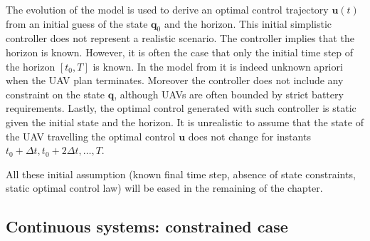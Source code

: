 The evolution of the model is used to derive an optimal control trajectory $\mathbf{u}(t)$ from an initial guess of the state $\mathbf{q}_0$ and the horizon. This initial simplistic controller does not represent a realistic scenario. The controller implies that the horizon is known. However, it is often the case that only the initial time step of the horizon $[t_0,T]$ is known. In the model from  it is indeed unknown apriori when the UAV plan terminates. Moreover the controller does not include any constraint on the state $\mathbf{q}$, although UAVs are often bounded by strict battery requirements. Lastly, the optimal control generated with such controller is static given the initial state and the horizon. It is unrealistic to assume that the state of the UAV travelling the optimal control $\mathbf{u}$ does not change for instants $t_0+\Delta t,t_0+2\Delta t,\dots,T$.

All these initial assumption (known final time step, absence of state constraints, static optimal control law) will be eased in the remaining of the chapter.

\subsection{Continuous systems: constrained case}
\label{cp:opt:constrained}

